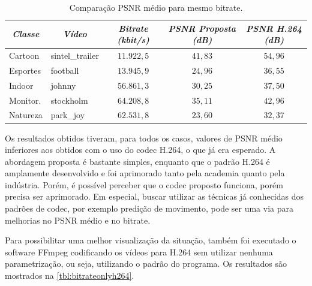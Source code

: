 \documentclass[cic,tc]{iiufrgs}
\begin{document}
\begin{table}[h]
    \caption{Comparação PSNR médio para mesmo bitrate.}
    \centering
        \begin{tabular}{|l|l|c|c|c|}
          \hline
          \multicolumn{1}{|c}{\textit{Classe}} & 
          \multicolumn{1}{|c}{\textit{Vídeo}} & 
          \multicolumn{1}{|c|}{\textit{Bitrate (kbit/s)}} &
          \multicolumn{1}{|c}{\textit{PSNR Proposta (dB)}} & 
          \multicolumn{1}{|c|}{\textit{PSNR H.264 (dB)}} \\
          \hline
          \hline
          Cartoon & sintel\_trailer & $11.922,5$ & $41,83$ & $54,96$ \\
          Esportes & football & $13.945,9$ & $24,96$ & $36,55$ \\
          Indoor & johnny & $56.861,3$ & $30,25$ & $37,50$ \\
          Monitor. & stockholm & $64.208,8$ & $35,11$ & $42,96$ \\
          Natureza & park\_joy & $62.531,8$ & $23,60$ & $32,37$ \\
          \hline
        \end{tabular}
    \label{tbl:bitrateh264}
\end{table}

Os resultados obtidos tiveram, para todos os casos, valores de PSNR médio inferiores
aos obtidos com o uso do codec H.264, o que já era esperado.
A abordagem proposta é bastante simples, enquanto que o padrão H.264 é amplamente 
desenvolvido e foi aprimorado tanto pela 
academia quanto pela indústria.
Porém, é possível perceber que 
o codec proposto funciona, porém precisa ser aprimorado.
Em especial, buscar utilizar as técnicas já conhecidas dos padrões de codec, 
por exemplo predição de movimento, pode 
ser uma via para melhorias no PSNR médio e no bitrate.

Para possibilitar uma melhor visualização da situação, também foi executado o 
software FFmpeg codificando os vídeos para H.264 sem utilizar nenhuma parametrização, 
ou seja, utilizando o padrão do programa.
Os resultados são mostrados na \autoref{tbl:bitrateonlyh264}.
\end{document}
